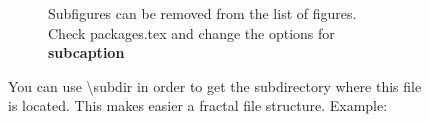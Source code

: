 \begin{figure}[h]
\begin{subfigure}{.45\textwidth}
        \caption{Subfigures can be removed from the list of figures. Check packages.tex and change the options for \textbf{subcaption}}
        \label{fig:figure-conclusion}
    \end{subfigure}
    \caption{
        You can use \textbackslash subdir in order to get the subdirectory
        where this file is located. This makes easier a fractal file structure.
        Example: \subdir
    }
    \label{fig:fig1}
\end{figure}
